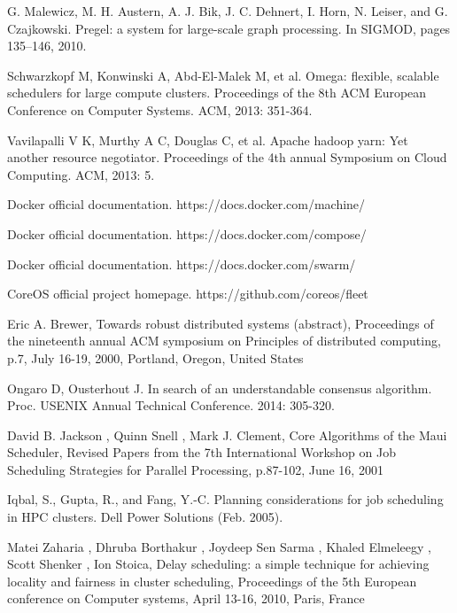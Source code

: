 \documentclass[UTF8,a4paper]{ctexart}
\begin{document}
\begin{thebibliography}{0}
    G. Malewicz, M. H. Austern, A. J. Bik, J. C. Dehnert, I. Horn, N. Leiser, and G. Czajkowski. Pregel: a system for large-scale graph processing. In SIGMOD, pages 135–146, 2010.

    Schwarzkopf M, Konwinski A, Abd-El-Malek M, et al. Omega: flexible, scalable schedulers for large compute clusters. Proceedings of the 8th ACM European Conference on Computer Systems. ACM, 2013: 351-364.

    Vavilapalli V K, Murthy A C, Douglas C, et al. Apache hadoop yarn: Yet another resource negotiator. Proceedings of the 4th annual Symposium on Cloud Computing. ACM, 2013: 5.

    Docker official documentation. https://docs.docker.com/machine/

    Docker official documentation. https://docs.docker.com/compose/

    Docker official documentation. https://docs.docker.com/swarm/

    CoreOS official project homepage. https://github.com/coreos/fleet

    Eric A. Brewer, Towards robust distributed systems (abstract), Proceedings of the nineteenth annual ACM symposium on Principles of distributed computing, p.7, July 16-19, 2000, Portland, Oregon, United States

    Ongaro D, Ousterhout J. In search of an understandable consensus algorithm. Proc. USENIX Annual Technical Conference. 2014: 305-320.

    David B. Jackson , Quinn Snell , Mark J. Clement, Core Algorithms of the Maui Scheduler, Revised Papers from the 7th International Workshop on Job Scheduling Strategies for Parallel Processing, p.87-102, June 16, 2001

    Iqbal, S., Gupta, R., and Fang, Y.-C. Planning considerations for job scheduling in HPC clusters. Dell Power Solutions (Feb. 2005).

    Matei Zaharia , Dhruba Borthakur , Joydeep Sen Sarma , Khaled Elmeleegy , Scott Shenker , Ion Stoica, Delay scheduling: a simple technique for achieving locality and fairness in cluster scheduling, Proceedings of the 5th European conference on Computer systems, April 13-16, 2010, Paris, France


\end{thebibliography}
\end{document}
